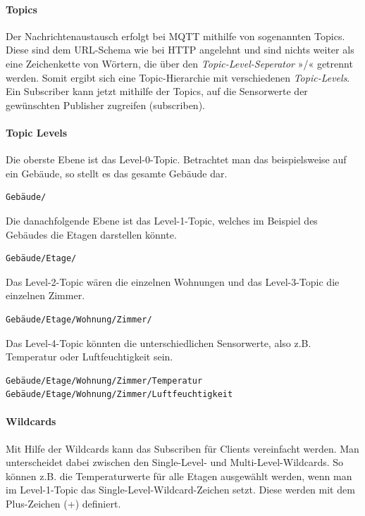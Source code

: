 \paragraph{Topics}

Der Nachrichtenaustausch erfolgt bei MQTT mithilfe von sogenannten Topics. Diese sind dem URL-Schema wie bei HTTP angelehnt und sind nichts weiter als eine Zeichenkette von Wörtern, die über den \textit{Topic-Level-Seperator} »/«  getrennt werden. Somit ergibt sich eine Topic-Hierarchie mit verschiedenen \textit{Topic-Levels}. Ein Subscriber kann jetzt mithilfe der Topics, auf die Sensorwerte der gewünschten Publisher zugreifen (subscriben). 

\paragraph{Topic Levels}

Die oberste Ebene ist das Level-0-Topic. Betrachtet man das beispielsweise auf ein Gebäude, so stellt es das gesamte Gebäude dar. 

\begin{verbatim}
Gebäude/
\end{verbatim}

Die danachfolgende Ebene ist das Level-1-Topic, welches im Beispiel des Gebäudes die Etagen darstellen könnte. 

\begin{verbatim}
Gebäude/Etage/
\end{verbatim}

Das Level-2-Topic wären die einzelnen Wohnungen und das Level-3-Topic die einzelnen Zimmer. 

\begin{verbatim}
Gebäude/Etage/Wohnung/Zimmer/
\end{verbatim}

Das Level-4-Topic könnten die unterschiedlichen Sensorwerte, also z.B. Temperatur oder Luftfeuchtigkeit sein. 

\begin{verbatim}
Gebäude/Etage/Wohnung/Zimmer/Temperatur
Gebäude/Etage/Wohnung/Zimmer/Luftfeuchtigkeit
\end{verbatim}

\paragraph{Wildcards}

Mit Hilfe der Wildcards kann das Subscriben für Clients vereinfacht werden. Man unterscheidet dabei zwischen den Single-Level- und Multi-Level-Wildcards. So können z.B. die Temperaturwerte für alle Etagen ausgewählt werden, wenn man im Level-1-Topic das Single-Level-Wildcard-Zeichen setzt. Diese werden mit dem Plus-Zeichen (+) definiert.   

